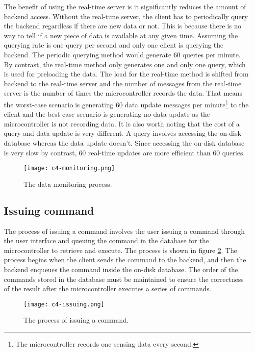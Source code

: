 \documentclass[../thesis.tex]{subfiles}
\begin{document}
The benefit of using the real-time server is it significantly reduces the amount of backend access. Without the real-time server, the client has to periodically query the backend regardless if there are new data or not. This is because there is no way to tell if a new piece of data is available at any given time. Assuming the querying rate is one query per second and only one client is querying the backend. The periodic querying method would generate 60 queries per minute. By contrast, the real-time method only generates one and only one query, which is used for preloading the data. The load for the real-time method is shifted from backend to the real-time server and the number of messages from the real-time server is the number of times the microcontroller records the data. That means the worst-case scenario is generating 60 data update messages per minute\footnote{The microcontroller records one sensing data every second.} to the client and the best-case scenario is generating no data update as the microcontroller is not recording data. It is also worth noting that the cost of a query and data update is very different. A query involves accessing the on-disk database whereas the data update doesn't. Since accessing the on-disk database is very slow by contrast, 60 real-time updates are more efficient than 60 queries.

\begin{figure}[!ht]
\centering
\texttt{[image: c4-monitoring.png]}
\caption{The data monitoring process.}
\label{fig:monitoring}
\end{figure}

\subsection{Issuing command}

The process of issuing a command involves the user issuing a command through the user interface and queuing the command in the database for the microcontroller to retrieve and execute. The process is shown in figure \ref{fig:issuing}. The process begins when the client sends the command to the backend, and then the backend enqueues the command inside the on-disk database. The order of the commands stored in the database must be maintained to ensure the correctness of the result after the microcontroller executes a series of commands.


\begin{figure}[!ht]
\centering
\texttt{[image: c4-issuing.png]}
\caption{The process of issuing a command.}
\label{fig:issuing}
\end{figure}
\end{document}
